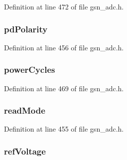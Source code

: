 Definition at line 472 of file gsn\_\-adc.h.

\hypertarget{a00023_aa94e3208ee17e78caee4087b51935b6f}{
\subsubsection[{pdPolarity}]{ {\bf pdPolarity}}}
\label{a00023_aa94e3208ee17e78caee4087b51935b6f}


Definition at line 456 of file gsn\_\-adc.h.

\hypertarget{a00023_aa408128ec811f37d608a5367f1adc0b3}{
\subsubsection[{powerCycles}]{ {\bf powerCycles}}}
\label{a00023_aa408128ec811f37d608a5367f1adc0b3}


Definition at line 469 of file gsn\_\-adc.h.

\hypertarget{a00023_adc1c91e0c2cb5edf545342b449c9d8c3}{
\subsubsection[{readMode}]{ {\bf readMode}}}
\label{a00023_adc1c91e0c2cb5edf545342b449c9d8c3}


Definition at line 455 of file gsn\_\-adc.h.

\hypertarget{a00023_ac0bb9f5eae3d25dcaba26a215085973c}{
\subsubsection[{refVoltage}]{ {\bf refVoltage}}}
\label{a00023_ac0bb9f5eae3d25dcaba26a215085973c}


